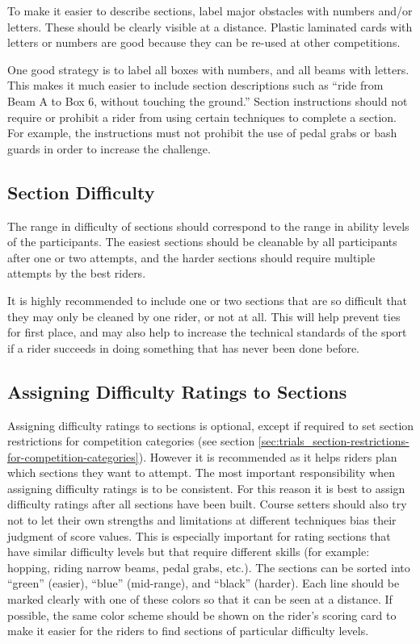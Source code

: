 To make it easier to describe sections, label major obstacles with numbers and/or letters.
These should be clearly visible at a distance.
Plastic laminated cards with letters or numbers are good because they can be re-used at other competitions.

One good strategy is to label all boxes with numbers, and all beams with letters.
This makes it much easier to include section descriptions such as ``ride from Beam A to Box 6, without touching the ground.''
Section instructions should not require or prohibit a rider from using certain techniques to complete a section.
For example, the instructions must not prohibit the use of pedal grabs or bash guards in order to increase the challenge.

\subsection{Section Difficulty}
The range in difficulty of sections should correspond to the range in ability levels of the participants.
The easiest sections should be cleanable by all participants after one or two attempts, and the harder sections should require multiple attempts by the best riders.

It is highly recommended to include one or two sections that are so difficult that they may only be cleaned by one rider, or not at all.
This will help prevent ties for first place, and may also help to increase the technical standards of the sport if a rider succeeds in doing something that has never been done before.

\subsection{Assigning Difficulty Ratings to Sections \label{subsec:trials_guidelines-for-course-setters_assigning-difficulty-ratings}}
Assigning difficulty ratings to sections is optional, except if required to set section restrictions for competition categories (see section \ref{sec:trials_section-restrictions-for-competition-categories}).
However it is recommended as it helps riders plan which sections they want to attempt.
The most important responsibility when assigning difficulty ratings is to be consistent.
For this reason it is best to assign difficulty ratings after all sections have been built.
Course setters should also try not to let their own strengths and limitations at different techniques bias their judgment of score values.
This is especially important for rating sections that have similar difficulty levels but that require different skills (for example: hopping, riding narrow beams, pedal grabs, etc.).
The sections can be sorted into ``green'' (easier), ``blue'' (mid-range), and ``black'' (harder).
Each line should be marked clearly with one of these colors so that it can be seen at a distance.
If possible, the same color scheme should be shown on the rider's scoring card to make it easier for the riders to find sections of particular difficulty levels.

